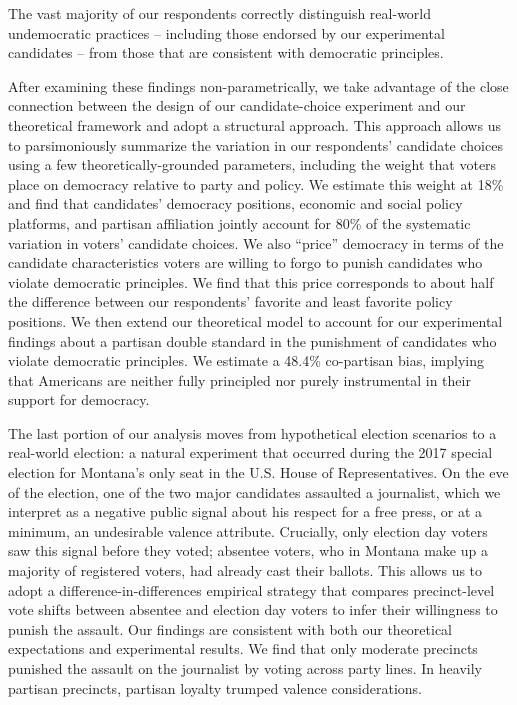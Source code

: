 \documentclass[letterpaper, 12pt]{article}
\begin{document}
\begin{raggedright}
\begin{description}[style=unboxed,leftmargin=0em,itemsep=0em]
\item[8. Americans have a solid understanding of what democracy is and what it is not:] The vast majority of our respondents correctly distinguish real-world undemocratic practices -- including those endorsed by our experimental candidates -- from those that are consistent with democratic principles.
\end{description}

After examining these findings non-parametrically, we take advantage of the close connection between the design of our candidate-choice experiment and our theoretical framework and adopt a structural approach. This approach allows us to parsimoniously summarize the variation in our respondents' candidate choices using a few theoretically-grounded parameters, including the weight that voters place on democracy relative to party and policy. We estimate this weight at 18\% and find that candidates' democracy positions, economic and social policy platforms, and partisan affiliation jointly account for 80\% of the systematic variation in voters' candidate choices. We also ``price'' democracy in terms of the candidate characteristics voters are willing to forgo to punish candidates who violate democratic principles. We find that this price corresponds to about half the difference between our respondents' favorite and least favorite policy positions. We then extend our theoretical model to account for our experimental findings about a partisan double standard in the punishment of candidates who violate democratic principles. We estimate a 48.4\% co-partisan bias, implying that Americans are neither fully principled nor purely instrumental in their support for democracy.

The last portion of our analysis moves from hypothetical election scenarios to a real-world election: a natural experiment that occurred during the 2017 special election for Montana's only seat in the U.S. House of Representatives. On the eve of the election, one of the two major candidates assaulted a journalist, which we interpret as a negative public signal about his respect for a free press, or at a minimum, an undesirable valence attribute. Crucially, only election day voters saw this signal before they voted; absentee voters, who in Montana make up a majority of registered voters, had already cast their ballots. This allows us to adopt a difference-in-differences empirical strategy that compares precinct-level vote shifts between absentee and election day voters to infer their willingness to punish the assault. Our findings are consistent with both our theoretical expectations and experimental results. We find that only moderate precincts punished the assault on the journalist by voting across party lines. In heavily partisan precincts, partisan loyalty trumped valence considerations.


\end{raggedright}
\end{document}
